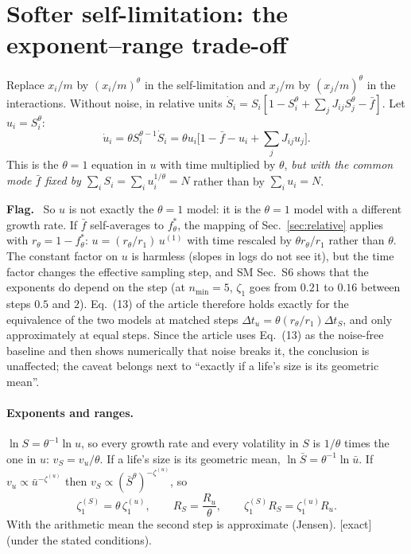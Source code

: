 \documentclass[11pt]{article}
\newcommand{\Sb}{\bar S}
\newcommand{\fb}{\bar f}
\newcommand{\exact}{\textsf{\small[exact]}}
\newenvironment{flag}{\par\medskip\noindent\textcolor{red!70!black}{\textbf{Flag.}}\ }{\par\medskip}
\begin{document}
\section{Softer self-limitation: the exponent--range trade-off}
\label{sec:theta}

Replace $x_i/m$ by $(x_i/m)^\theta$ in the self-limitation and $x_j/m$ by $(x_j/m)^\theta$ in the interactions.  Without noise,
in relative units $\dot S_i=S_i[1-S_i^\theta+\sum_jJ_{ij}S_j^\theta-\fb]$.  Let $u_i=S_i^\theta$:
\begin{equation}
\dot u_i=\theta S_i^{\theta-1}\dot S_i=\theta u_i\Big[1-\fb-u_i+\sum_jJ_{ij}u_j\Big].
\end{equation}
This is the $\theta=1$ equation in $u$ with time multiplied by $\theta$, \emph{but with the common mode $\fb$ fixed by
$\sum_iS_i=\sum_iu_i^{1/\theta}=N$} rather than by $\sum_iu_i=N$.

\begin{flag}
So $u$ is not exactly the $\theta=1$ model: it is the $\theta=1$ model with a different growth rate.  If $\fb$ self-averages to
$f^*_\theta$, the mapping of Sec.~\ref{sec:relative} applies with $r_\theta=1-f^*_\theta$: $u=(r_\theta/r_1)\,u^{(1)}$ with time rescaled by
$\theta r_\theta/r_1$ rather than $\theta$.  The constant factor on $u$ is harmless (slopes in logs do not see it), but the time factor
changes the effective sampling step, and SM Sec.~S6 shows that the exponents do depend on the step (at $n_{\min}=5$, $\zeta_1$
goes from $0.21$ to $0.16$ between steps $0.5$ and $2$).  Eq.~(13) of the article therefore holds exactly for the
equivalence of the two models at matched steps $\Delta t_u=\theta(r_\theta/r_1)\Delta t_S$, and only approximately at equal steps.  Since
the article uses Eq.~(13) as the noise-free baseline and then shows numerically that noise breaks it, the conclusion is
unaffected; the caveat belongs next to ``exactly if a life's size is its geometric mean''.
\end{flag}

\paragraph{Exponents and ranges.}  $\ln S=\theta^{-1}\ln u$, so every growth rate and every volatility in $S$ is $1/\theta$ times
the one in $u$: $v_S=v_u/\theta$.  If a life's size is its geometric mean, $\ln\Sb=\theta^{-1}\ln\bar u$.  If $v_u\propto\bar u^{-\zeta^{(u)}}$
then $v_S\propto(\Sb^\theta)^{-\zeta^{(u)}}$, so
\begin{equation}
\zeta_1^{(S)}=\theta\,\zeta_1^{(u)},\qquad R_S=\frac{R_u}{\theta},\qquad \zeta_1^{(S)}R_S=\zeta_1^{(u)}R_u .
\end{equation}
With the arithmetic mean the second step is approximate (Jensen).  \exact{} (under the stated conditions).
\end{document}
